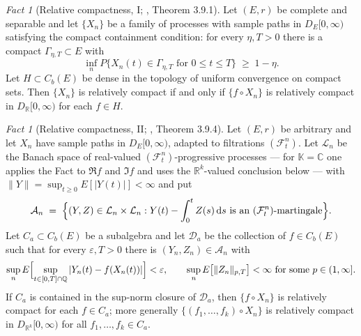 \documentclass[11pt,a4paper]{article}
\theoremstyle{plain}
\theoremstyle{definition}
\theoremstyle{remark}
\newtheorem{fact}[theorem]{Fact}
\newcommand{\R}{\mathbb{R}}
\newcommand{\Q}{\mathbb{Q}}
\newcommand{\Cb}{C_b}                          %
\newcommand{\DE}{D_E[0,\infty)}
\newcommand{\Filt}{\mathcal{F}}
\newcommand{\K}{\mathbb{K}}
\newcommand{\C}{\mathbb{C}}
\newcommand{\dif}{\,\mathrm{d}}
\newcommand{\EK}{\cite{EK86}}
\begin{document}
\begin{fact}[Relative compactness, I; \EK, Theorem 3.9.1]
  \label{fact:relcompact}
  Let $(E,r)$ be complete and separable and let $\{X_n\}$ be a family of
  processes with sample paths in $\DE$ satisfying the compact containment
  condition: for every $\eta, T > 0$ there is a compact
  $\Gamma_{\eta,T} \subset E$ with
  \begin{equation}
    \label{eq:ccn}
    \inf_n P\{ X_n(t) \in \Gamma_{\eta,T} \text{ for } 0 \leq t \leq T \}
      \;\geq\; 1 - \eta .
  \end{equation}
  Let $H \subset \Cb(E)$ be dense in the topology of uniform convergence on
  compact sets.  Then $\{X_n\}$ is relatively compact if and only if
  $\{f \circ X_n\}$ is relatively compact in $D_{\R}[0,\infty)$ for each
  $f \in H$.
\end{fact}

\begin{fact}[Relative compactness, II; \EK, Theorem 3.9.4]
  \label{fact:relcompact2}
  Let $(E,r)$ be arbitrary and let $X_n$ have sample paths in $\DE$, adapted to
  filtrations $(\Filt^n_t)$.  Let $\mathcal{L}_n$ be the Banach space of
  real-valued $(\Filt^n_t)$-progressive processes --- for $\K = \C$ one applies
  the Fact to $\Re f$ and $\Im f$ and uses the $\R^k$-valued conclusion below ---
  with
  $\lVert Y \rVert = \sup_{t \geq 0} E[|Y(t)|] < \infty$ and put
  \begin{equation}
    \label{eq:An}
    \mathcal{A}_n \;=\; \Bigl\{ (Y,Z) \in \mathcal{L}_n \times \mathcal{L}_n :
      Y(t) - \int_0^t Z(s) \dif s \text{ is an } (\Filt^n_t)\text{-martingale} \Bigr\}.
  \end{equation}
  Let $C_a \subset \Cb(E)$ be a subalgebra and let $\mathcal{D}_a$ be the
  collection of $f \in \Cb(E)$ such that for every $\varepsilon, T > 0$ there is
  $(Y_n, Z_n) \in \mathcal{A}_n$ with
  \begin{equation}
    \label{eq:relcompact2}
    \sup_n E\Bigl[ \sup_{t \in [0,T] \cap \Q} |Y_n(t) - f(X_n(t))| \Bigr]
      < \varepsilon,
    \qquad
    \sup_n E\bigl[ \lVert Z_n \rVert_{p,T} \bigr] < \infty
    \text{ for some } p \in (1,\infty].
  \end{equation}
  If $C_a$ is contained in the sup-norm closure of $\mathcal{D}_a$, then
  $\{f \circ X_n\}$ is relatively compact for each $f \in C_a$; more generally
  $\{(f_1,\dots,f_k) \circ X_n\}$ is relatively compact in
  $D_{\R^k}[0,\infty)$ for all $f_1,\dots,f_k \in C_a$.
\end{fact}
\end{document}
